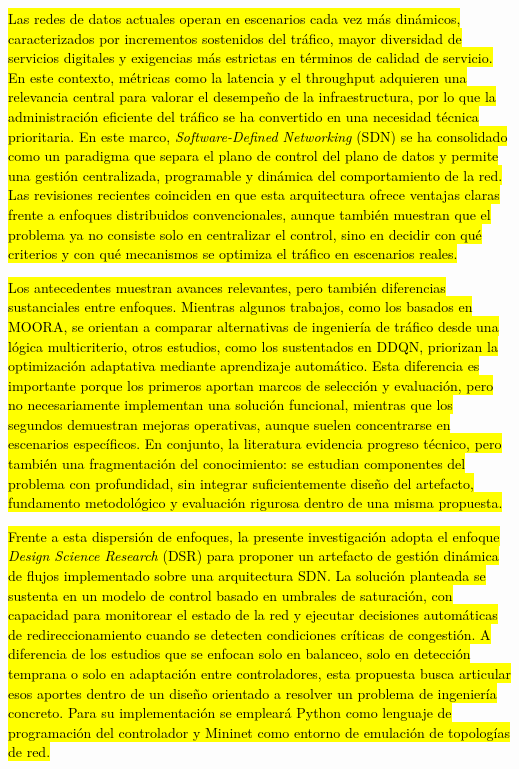 \documentclass[12pt,a4paper]{article}
\newcommand{\introhl}[2]{%
    {\sethlcolor{#1}\hl{#2}}%
}
\begin{document}
\noindent
\introhl{introcontext}{Las redes de datos actuales operan en escenarios cada vez más dinámicos, caracterizados por incrementos sostenidos del tráfico, mayor diversidad de servicios digitales y exigencias más estrictas en términos de calidad de servicio. En este contexto, métricas como la latencia y el throughput adquieren una relevancia central para valorar el desempeño de la infraestructura, por lo que la administración eficiente del tráfico se ha convertido en una necesidad técnica prioritaria. En este marco, \textit{Software-Defined Networking} (SDN) se ha consolidado como un paradigma que separa el plano de control del plano de datos y permite una gestión centralizada, programable y dinámica del comportamiento de la red. Las revisiones recientes coinciden en que esta arquitectura ofrece ventajas claras frente a enfoques distribuidos convencionales, aunque también muestran que el problema ya no consiste solo en centralizar el control, sino en decidir con qué criterios y con qué mecanismos se optimiza el tráfico en escenarios reales.} \parencite{survey_ai_sdn, openflow_review}

\introhl{introproblem}{Los antecedentes muestran avances relevantes, pero también diferencias sustanciales entre enfoques. Mientras algunos trabajos, como los basados en MOORA, se orientan a comparar alternativas de ingeniería de tráfico desde una lógica multicriterio, otros estudios, como los sustentados en DDQN, priorizan la optimización adaptativa mediante aprendizaje automático. Esta diferencia es importante porque los primeros aportan marcos de selección y evaluación, pero no necesariamente implementan una solución funcional, mientras que los segundos demuestran mejoras operativas, aunque suelen concentrarse en escenarios específicos. En conjunto, la literatura evidencia progreso técnico, pero también una fragmentación del conocimiento: se estudian componentes del problema con profundidad, sin integrar suficientemente diseño del artefacto, fundamento metodológico y evaluación rigurosa dentro de una misma propuesta.} \parencite{moora_sdn, ddqn_sdn}

\introhl{introsolution}{Frente a esta dispersión de enfoques, la presente investigación adopta el enfoque \textit{Design Science Research} (DSR) para proponer un artefacto de gestión dinámica de flujos implementado sobre una arquitectura SDN. La solución planteada se sustenta en un modelo de control basado en umbrales de saturación, con capacidad para monitorear el estado de la red y ejecutar decisiones automáticas de redireccionamiento cuando se detecten condiciones críticas de congestión. A diferencia de los estudios que se enfocan solo en balanceo, solo en detección temprana o solo en adaptación entre controladores, esta propuesta busca articular esos aportes dentro de un diseño orientado a resolver un problema de ingeniería concreto. Para su implementación se empleará Python como lenguaje de programación del controlador y Mininet como entorno de emulación de topologías de red.} \parencite{dynamic_lb_sdn, deep_learning_ryu, qos_lb_sdn, adaptive_lb_sdn}
\end{document}
